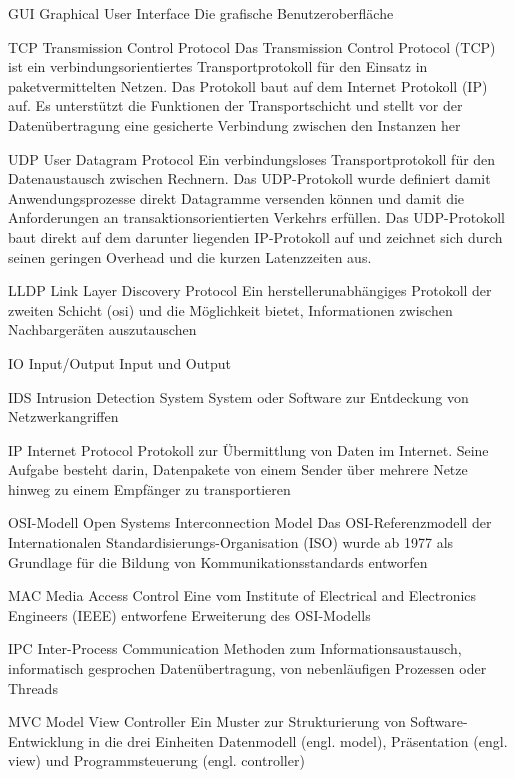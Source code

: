 
	{GUI}
	{Graphical User Interface}
	{Die grafische Benutzeroberfläche}

	{TCP}
	{Transmission Control Protocol}
	{Das Transmission Control Protocol (TCP) ist ein verbindungsorientiertes Transportprotokoll für den Einsatz in paketvermittelten Netzen. Das Protokoll baut auf dem Internet Protokoll (IP) auf. Es unterstützt die Funktionen der Transportschicht und stellt vor der Datenübertragung eine gesicherte Verbindung zwischen den Instanzen her}

	{UDP}
	{User Datagram Protocol}
	{Ein verbindungsloses Transportprotokoll für den Datenaustausch zwischen Rechnern. Das UDP-Protokoll wurde definiert damit Anwendungsprozesse direkt Datagramme versenden können und damit die Anforderungen an transaktionsorientierten Verkehrs erfüllen. Das UDP-Protokoll baut direkt auf dem darunter liegenden IP-Protokoll auf und zeichnet sich durch seinen geringen Overhead und die kurzen Latenzzeiten aus.}

	{LLDP}
	{Link Layer Discovery Protocol}
	{Ein herstellerunabhängiges Protokoll der zweiten Schicht (\gls{osi}) und die Möglichkeit bietet, Informationen zwischen Nachbargeräten auszutauschen}
	
	{IO}
	{Input/Output}
	{Input und Output}


	{IDS}
	{Intrusion Detection System}
	{System oder Software zur Entdeckung von Netzwerkangriffen}


	{IP}
	{Internet Protocol}
	{Protokoll zur Übermittlung von Daten im Internet. Seine Aufgabe besteht darin, Datenpakete von einem Sender über mehrere Netze hinweg zu einem Empfänger zu transportieren}
	
	{OSI-Modell}
	{Open Systems Interconnection Model}
	{Das OSI-Referenzmodell der Internationalen Standardisierungs-Organisation (ISO) wurde ab 1977 als Grundlage für die Bildung von Kommunikationsstandards entworfen}


	{MAC}
	{Media Access Control}
	{Eine vom Institute of Electrical and Electronics Engineers (IEEE) entworfene Erweiterung des OSI-Modells}


	{IPC}
	{Inter-Process Communication}
	{Methoden zum Informationsaustausch, informatisch gesprochen Datenübertragung, von nebenläufigen Prozessen oder Threads}


	{MVC}
	{Model View Controller}
	{Ein Muster zur Strukturierung von Software-Entwicklung in die drei Einheiten Datenmodell (engl. model), Präsentation (engl. view) und Programmsteuerung (engl. controller)}


